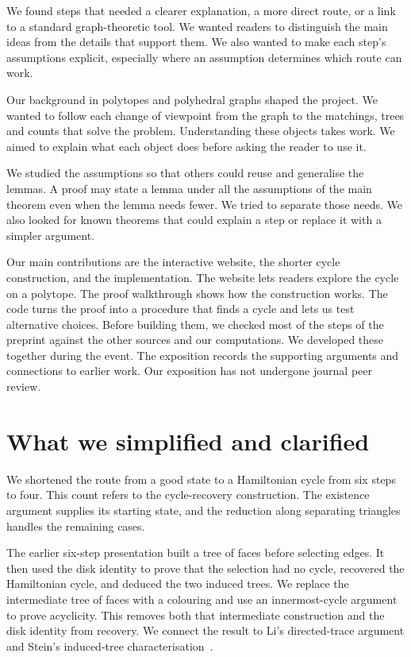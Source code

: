 \documentclass[11pt,a4paper]{article}
\begin{document}
We found steps that needed a clearer explanation, a more direct route, or a link to a standard graph-theoretic tool. We wanted readers to distinguish the main ideas from the details that support them. We also wanted to make each step's assumptions explicit, especially where an assumption determines which route can work.

Our background in polytopes and polyhedral graphs shaped the project. We wanted to follow each change of viewpoint from the graph to the matchings, trees and counts that solve the problem. Understanding these objects takes work. We aimed to explain what each object does before asking the reader to use it.

We studied the assumptions so that others could reuse and generalise the lemmas. A proof may state a lemma under all the assumptions of the main theorem even when the lemma needs fewer. We tried to separate those needs. We also looked for known theorems that could explain a step or replace it with a simpler argument.

Our main contributions are the interactive website, the shorter cycle construction, and the implementation. The website lets readers explore the cycle on a polytope. The proof walkthrough shows how the construction works. The code turns the proof into a procedure that finds a cycle and lets us test alternative choices. Before building them, we checked most of the steps of the preprint against the other sources and our computations. We developed these together during the event. The exposition records the supporting arguments and connections to earlier work. Our exposition has not undergone journal peer review.

\newpage
\section{What we simplified and clarified}
We shortened the route from a good state to a Hamiltonian cycle from six steps to four. This count refers to the cycle-recovery construction. The existence argument supplies its starting state, and the reduction along separating triangles handles the remaining cases.

The earlier six-step presentation built a tree of faces before selecting edges. It then used the disk identity to prove that the selection had no cycle, recovered the Hamiltonian cycle, and deduced the two induced trees. We replace the intermediate tree of faces with a colouring and use an innermost-cycle argument to prove acyclicity. This removes both that intermediate construction and the disk identity from recovery. We connect the result to Li's directed-trace argument and Stein's induced-tree characterisation~\cite{Li,Stein}.
\end{document}
